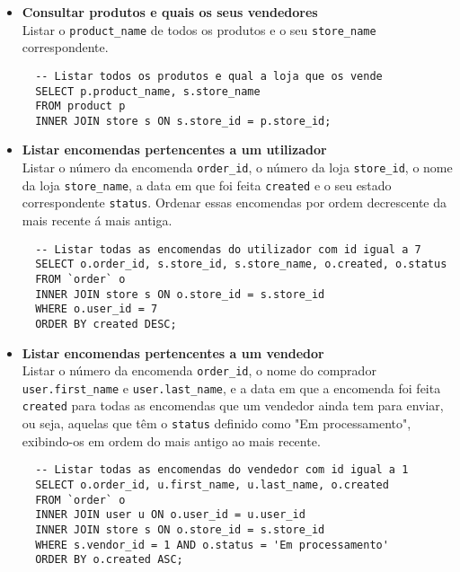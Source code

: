 \begin{itemize}
  \item \textbf{Consultar produtos e quais os seus vendedores}\\ 
    Listar o \texttt{product\_name} de todos os produtos e o seu \texttt{store\_name} correspondente.
    \vspace{10pt}
    \begin{lstlisting}
  -- Listar todos os produtos e qual a loja que os vende
  SELECT p.product_name, s.store_name
  FROM product p
  INNER JOIN store s ON s.store_id = p.store_id;
      \end{lstlisting}

  \item \textbf{Listar encomendas pertencentes a um utilizador}\\ 
    Listar o número da encomenda \texttt{order\_id}, o número da loja \texttt{store\_id}, o nome da loja \texttt{store\_name}, a data em que foi feita \texttt{created} e o seu estado correspondente \texttt{status}. Ordenar essas encomendas por ordem decrescente da mais recente á mais antiga.
    \vspace{10pt}
    \begin{lstlisting}
  -- Listar todas as encomendas do utilizador com id igual a 7
  SELECT o.order_id, s.store_id, s.store_name, o.created, o.status
  FROM `order` o
  INNER JOIN store s ON o.store_id = s.store_id
  WHERE o.user_id = 7
  ORDER BY created DESC;
      \end{lstlisting}

  \item \textbf{Listar encomendas pertencentes a um vendedor}\\ 
    Listar o número da encomenda \texttt{order\_id}, o nome do comprador \texttt{user.first\_name} e \texttt{user.last\_name}, e a data em que a encomenda foi feita \texttt{created} para todas as encomendas que um vendedor ainda tem para enviar, ou seja, aquelas que têm o \texttt{status} definido como "Em processamento", exibindo-os em ordem do mais antigo ao mais recente.
      \vspace{10pt}
      \begin{lstlisting}
  -- Listar todas as encomendas do vendedor com id igual a 1
  SELECT o.order_id, u.first_name, u.last_name, o.created
  FROM `order` o
  INNER JOIN user u ON o.user_id = u.user_id
  INNER JOIN store s ON o.store_id = s.store_id
  WHERE s.vendor_id = 1 AND o.status = 'Em processamento'
  ORDER BY o.created ASC;
        \end{lstlisting}

\end{itemize}






